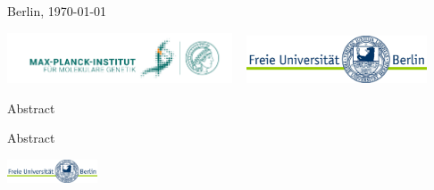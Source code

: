 \documentclass[final]{beamer}
\begin{document}
\begin{frame}[t]
\begin{center}
\begin{block}
Berlin, \today

\end{block}

\includegraphics[width=0.5\textwidth]{images/MPIMG_RGB_gruen.png}
~
\includegraphics[width=0.4\textwidth]{images/fu-logo_bildschirm_RGB1.jpg}
\end{center}

\begin{block}{Abstract}
\begin{abstract}
the abstract.
\end{abstract}
\end{block}
\end{frame}

\begin{frame}[t]
\begin{block}
\maketitle
\end{block}
\begin{block}{Abstract}
\begin{abstract}
the abstract.
\end{abstract}
\end{block}
\begin{block}

\end{block}
\includegraphics[width=0.2\textwidth]{images/fu-logo_bildschirm_RGB1.jpg}
\begin{block}

\end{block}
\end{frame}
\end{document}
